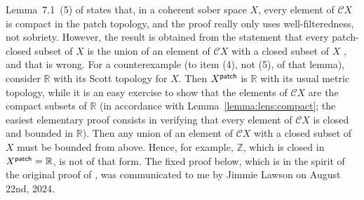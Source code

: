 \documentclass[preprint,12pt]{elsarticle}
\newcommand{\real}{\mathbb{R}}
\newcommand\patch{{\text{\textsf{patch}}}}
\begin{document}
Lemma~7.1~(5) of \cite{KL:measureext} states that, in a coherent sober
space $X$, every element of $\mathcal C X$ is compact in the patch
topology, and the proof really only uses well-filteredness, not
sobriety.  However, the result is obtained from the statement that
every patch-closed subset of $X$ is the union of an element of
$\mathcal C X$ with a closed subset of $X$
\cite[Lemma~7.1~(4)]{KL:measureext}, and that is wrong.  For a
counterexample (to item (4), not (5), of that lemma), consider $\real$
with its Scott topology for $X$.  Then $X^\patch$ is $\real$ with its
usual metric topology, while it is an easy exercise to show that the
elements of $\mathcal C X$ are the compact subsets of $\real$ (in
accordance with Lemma~\ref{lemma:lens:compact}; the easiest elementary
proof consists in verifying that every element of $\mathcal C X$ is
closed and bounded in $\real$).  Then any union of an element of
$\mathcal C X$ with a closed subset of $X$ must be bounded from above.
Hence, for example, $\mathbb Z$, which is closed in
$X^\patch = \real$, is not of that form.  The fixed proof below, which
is in the spirit of the original proof of
\cite[Lemma~7.1~(5)]{KL:measureext}, was communicated to me by Jimmie
Lawson on August 22nd, 2024.
\end{document}
